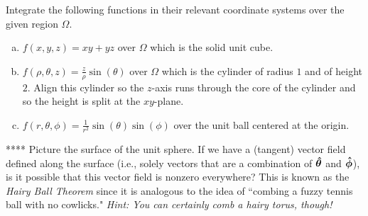 \documentclass[12pt]{article} %
\begin{document}
\vspace*{1cm}
\begin{problem}
Integrate the following functions in their relevant coordinate systems over the given region $\Omega$.
\begin{enumerate}[(a)]
    \item $f(x,y,z) = xy+yz$ over $\Omega$ which is the solid unit cube.
    \item $f(\rho,\theta,z) = \frac{z}{\rho}\sin(\theta)$ over $\Omega$ which is the cylinder of radius $1$ and of height $2$. Align this cylinder so the $z$-axis runs through the core of the cylinder and so the height is split at the $xy$-plane.
    \item $f(r,\theta,\phi) = \frac{1}{r^2}\sin(\theta)\sin(\phi)$ over the unit ball centered at the origin.
\end{enumerate}
\end{problem}


\vspace*{1cm}
\begin{problem}
    **** Picture the surface of the unit sphere.  If we have a (tangent) vector field defined along the surface (i.e., solely vectors that are a combination of $\boldsymbol{\boldsymbol{\hat{\theta}}}$ and $\boldsymbol{\boldsymbol{\hat{\phi}}}$), is it possible that this vector field is nonzero everywhere? This is known as the \emph{Hairy Ball Theorem} since it is analogous to the idea of ``combing a fuzzy tennis ball with no cowlicks." \emph{Hint: You can certainly comb a hairy torus, though!}
\end{problem}
\end{document}
